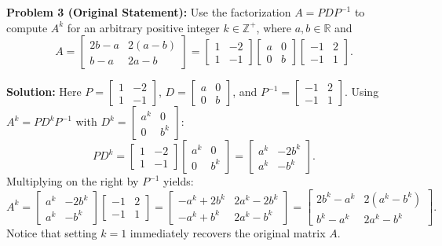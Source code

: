 \documentclass[11pt, letterpaper]{article}
\theoremstyle{definition}
\theoremstyle{remark}
\begin{document}
\vspace{0.8em}
\textbf{Problem 3 (Original Statement):}
Use the factorization $A = PDP^{-1}$ to compute $A^{k}$ for an arbitrary positive integer $k \in \mathbb{Z}^{+}$, where $a, b \in \mathbb{R}$ and
\[
A = \begin{bmatrix} 2b - a & 2(a - b) \\ b - a & 2a - b \end{bmatrix} = \begin{bmatrix} 1 & -2 \\ 1 & -1 \end{bmatrix} \begin{bmatrix} a & 0 \\ 0 & b \end{bmatrix} \begin{bmatrix} -1 & 2 \\ -1 & 1 \end{bmatrix}.
\]

\textbf{Solution:}
Here $P = \begin{bmatrix} 1 & -2 \\ 1 & -1 \end{bmatrix}$, $D = \begin{bmatrix} a & 0 \\ 0 & b \end{bmatrix}$, and $P^{-1} = \begin{bmatrix} -1 & 2 \\ -1 & 1 \end{bmatrix}$. Using $A^{k} = PD^{k}P^{-1}$ with $D^{k} = \begin{bmatrix} a^{k} & 0 \\ 0 & b^{k} \end{bmatrix}$:
\[
PD^{k} = \begin{bmatrix} 1 & -2 \\ 1 & -1 \end{bmatrix}\begin{bmatrix} a^{k} & 0 \\ 0 & b^{k} \end{bmatrix} = \begin{bmatrix} a^{k} & -2b^{k} \\ a^{k} & -b^{k} \end{bmatrix}.
\]
Multiplying on the right by $P^{-1}$ yields:
\[
A^{k} = \begin{bmatrix} a^{k} & -2b^{k} \\ a^{k} & -b^{k} \end{bmatrix}\begin{bmatrix} -1 & 2 \\ -1 & 1 \end{bmatrix} = \begin{bmatrix} -a^{k} + 2b^{k} & 2a^{k} - 2b^{k} \\ -a^{k} + b^{k} & 2a^{k} - b^{k} \end{bmatrix} = \begin{bmatrix} 2b^{k} - a^{k} & 2(a^{k} - b^{k}) \\ b^{k} - a^{k} & 2a^{k} - b^{k} \end{bmatrix}.
\]
Notice that setting $k = 1$ immediately recovers the original matrix $A$.
\end{document}
